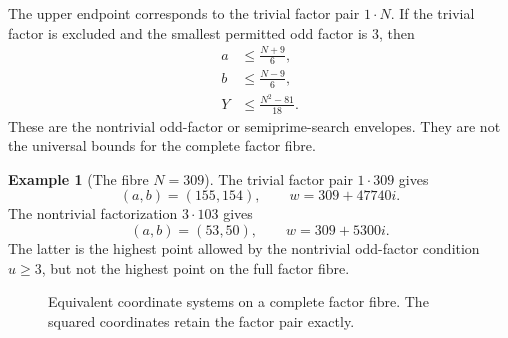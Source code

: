 \documentclass[11pt]{article}
\theoremstyle{definition}
\newtheorem{example}[theorem]{Example}
\theoremstyle{remark}
\newcommand{\1}{\mathbf{1}}
\begin{document}
The upper endpoint corresponds to the trivial factor pair $1\cdot N$.  If the trivial factor is excluded and the smallest permitted odd factor is $3$, then
\begin{align}
 a&\le\frac{N+9}{6},
 \label{eq:a-three}\\
 b&\le\frac{N-9}{6},
 \label{eq:b-three}\\
 Y&\le\frac{N^2-81}{18}.
 \label{eq:Y-three}
\end{align}
These are the nontrivial odd-factor or semiprime-search envelopes.  They are not the universal bounds for the complete factor fibre.

\begin{example}[The fibre $N=309$]
The trivial factor pair $1\cdot309$ gives
\[
 (a,b)=(155,154),
 \qquad
 w=309+47740i.
\]
The nontrivial factorization $3\cdot103$ gives
\[
 (a,b)=(53,50),
 \qquad
 w=309+5300i.
\]
The latter is the highest point allowed by the nontrivial odd-factor condition $u\ge3$, but not the highest point on the full factor fibre.
\end{example}

\begin{figure}[htbp]
\centering
{}
\caption{Equivalent coordinate systems on a complete factor fibre.  The squared coordinates retain the factor pair exactly.}
\label{fig:coordinate-map}
\end{figure}

\end{document}
